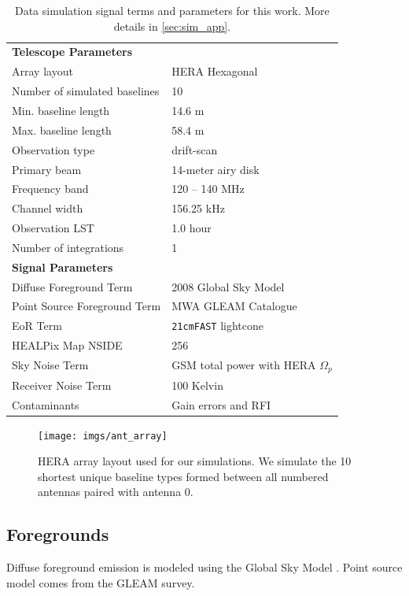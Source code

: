 \documentclass[a4paper,fleqn,usenatbib]{mnras}
\begin{document}
\begin{table}
\centering
\begin{tabular}{l l} 
\hline
\hline
{\bfseries Telescope Parameters} \\
Array layout & HERA Hexagonal \\
Number of simulated baselines & 10 \\
Min. baseline length & 14.6 m  \\
Max. baseline length & 58.4 m \\
Observation type & drift-scan \\
Primary beam & 14-meter airy disk \\
Frequency band & 120 -- 140 MHz \\
Channel width & 156.25 kHz \\
Observation LST & 1.0 hour \\
Number of integrations & 1 \\

\hline
{\bfseries Signal Parameters} \\
Diffuse Foreground Term & 2008 Global Sky Model \\
Point Source Foreground Term & MWA GLEAM Catalogue \\
EoR Term & \texttt{21cmFAST} lightcone \\
HEALPix Map NSIDE & 256 \\
Sky Noise Term & GSM total power with HERA $\Omega_p$ \\
Receiver Noise Term & 100 Kelvin \\
Contaminants & Gain errors and RFI \\
\hline
\hline
\end{tabular}
\caption{Data simulation signal terms and parameters for this work. More details in \autoref{sec:sim_app}.}
\label{tab:simulation}
\end{table}

\begin{figure}
\centering
\texttt{[image: imgs/ant\_array]}
\caption{HERA array layout used for our simulations. We simulate the 10 shortest unique baseline types formed between all numbered antennas paired with antenna 0.}
\label{fig:ant_array}
\end{figure}

\subsection{Foregrounds}
Diffuse foreground emission is modeled using the Global Sky Model \citep[GSM;][]{Oliveira2008}.
Point source model comes from the GLEAM survey.
\end{document}
